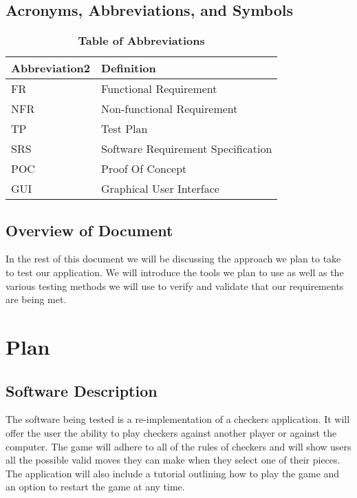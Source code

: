 \documentclass[12pt, titlepage]{article}
\begin{document}
\subsection{Acronyms, Abbreviations, and Symbols}
\begin{table}[hbp]
\caption{\textbf{Table of Abbreviations}} \label{Table}

\begin{tabularx}{\textwidth}{p{3cm}X}
\toprule
\textbf{Abbreviation2} & \textbf{Definition} \\
\midrule
FR & Functional Requirement\\
NFR & Non-functional Requirement\\
TP & Test Plan\\
SRS & Software Requirement Specification\\
POC & Proof Of Concept\\
GUI & Graphical User Interface\\
\bottomrule
\end{tabularx}

\end{table}




\subsection{Overview of Document}
In the rest of this document we will be discussing the approach we plan to take to test our application. We will introduce the tools we plan to use as well as the various testing methods we will use to verify and validate that our requirements are being met.
\section{Plan}
	
\subsection{Software Description}
The software being tested is a re-implementation of a checkers application. It will offer the user the ability to play checkers against another player or against the computer. The game will adhere to all of the rules of checkers and will show users all the possible valid moves they can make when they select one of their pieces. The application will also include a tutorial outlining how to play the game and an option to restart the game at any time.
\end{document}
